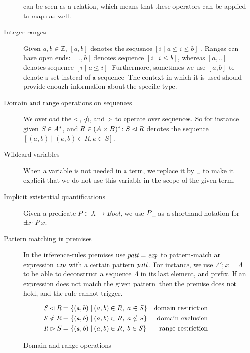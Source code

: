 \begin{description}
  can be seen as a relation, which means that these operators can be
  applied to maps as well.
\item[Integer ranges] Given $a, b \in \mathbb{Z}$, $[a, b]$ denotes the
  sequence $[i \mid a \leq i \leq b]$ . Ranges can have open ends: $[.., b]$
  denotes sequence $[i \mid i \leq b]$, whereas $[a, ..]$ denotes sequence
  $[i \mid a \leq i]$. Furthermore, sometimes we use $[a, b]$ to denote a set
  instead of a sequence. The context in which it is used should provide enough
  information about the specific type.
\item[Domain and range operations on sequences] We overload the $\lhd$,
  $\mathbin{\slashed{\lhd}}$, and $\rhd$ to operate over sequences. So for
  instance given $S \in A^{*}$, and $R \in (A \times B)^{*}$:
  $S \lhd R$ denotes the sequence
  $[ (a, b) \mid (a, b) \in R, a \in S]$.
\item[Wildcard variables] When a variable is not needed in a term, we replace
  it by $\wcard$ to make it explicit that we do not use this variable in the
  scope of the given term.
\item[Implicit existential quantifications] Given a predicate
  $P \in X \to Bool$, we use $P \wcard$ as a shorthand notation for
  $\exists x \cdot P~x$.
\item[Pattern matching in premises] In the inference-rules premises use
  $\mathit{patt} = \mathit{exp}$ to pattern-match an expression $\mathit{exp} $ with a
  certain pattern $\mathit{patt}$. For instance, we use $\Lambda'; x = \Lambda$ to
  be able to deconstruct a sequence $\Lambda$ in its last element, and prefix.
  If an expression does not match the given pattern, then the premise does not
  hold, and the rule cannot trigger.
\end{description}

\begin{figure}[htb]
  \begin{align*}
    \mathit{S} \lhd \mathit{R}
    & = \{ (a, b) \mid (a, b) \in R, ~ a \in S \}
    & \text{domain restriction}
    \\
    S \mathbin{\slashed{\lhd}} R
    & = \{ (a, b) \mid (a, b) \in R, ~ a \notin S \}
    & \text{domain exclusion}
    \\
    R \rhd S
    & = \{ (a, b) \mid (a, b) \in R, ~ b \in S \}
    & \text{range restriction}
  \end{align*}
  \caption{Domain and range operations}
  \label{fig:domain-and-range-ops}
\end{figure}